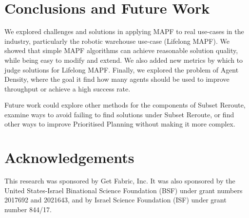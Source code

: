 \documentclass{article}
\newcommand{\sr}{Subset Reroute\xspace}
\newcommand{\lm}{Lifelong MAPF\xspace}
\begin{document}
\section{Conclusions and Future Work}

We explored challenges and solutions in applying MAPF to real use-cases in the industry, particularly the robotic warehouse use-case (\lm). We showed that simple MAPF algorithms can achieve reasonable solution quality, while being easy to modify and extend. We also added new metrics by which to judge solutions for \lm. Finally, we explored the problem of Agent Density, where the goal it find how many agents should be used to improve throughput or achieve a high success rate.

Future work could explore other methods for the components of \sr, examine ways to avoid failing to find solutions under \sr, 
or find other ways to improve Prioritised Planning without making it more complex.



\section{Acknowledgements}

This research was sponsored by Get Fabric, Inc.
It was also sponsored by the United States-Israel Binational Science Foundation (BSF) under grant numbers 2017692 and 2021643, and by Israel Science Foundation (ISF) under grant number 844/17.


\end{document}
